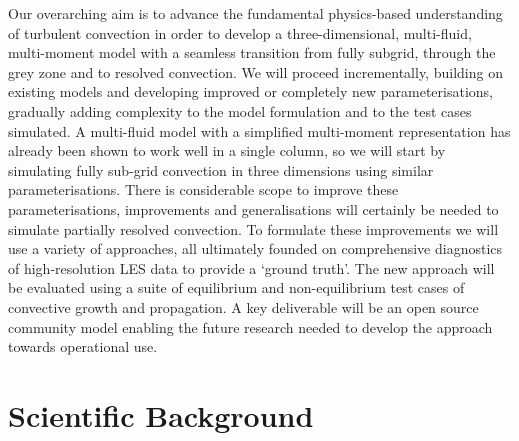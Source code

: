 \documentclass[11pt,a4paper]{article}
\begin{document}
Our overarching aim is to advance the fundamental physics-based understanding of turbulent convection in order to develop a three-dimensional, multi-fluid, multi-moment model with a seamless transition from {\color{blue} fully subgrid, through the grey zone and to resolved convection}. We will proceed incrementally, building on existing models and developing improved or completely new parameterisations, gradually adding complexity to the model formulation and to the test cases simulated.
A multi-fluid model with a simplified multi-moment representation has already been shown to work well in a single column, so we will start by simulating fully sub-grid convection in three dimensions using similar parameterisations.
There is considerable scope to improve these parameterisations, {\color{blue} improvements and generalisations will certainly be needed to simulate partially resolved convection. 
To formulate these improvements we will use a variety of approaches, all ultimately founded on comprehensive diagnostics of high-resolution LES data to provide a `ground truth'.}
The new approach will be evaluated using a suite of equilibrium and non-equilibrium test cases of convective growth and propagation. A key deliverable will be an open source community model enabling the future research needed to develop the approach towards operational use.




\section{Scientific Background}

\end{document}
